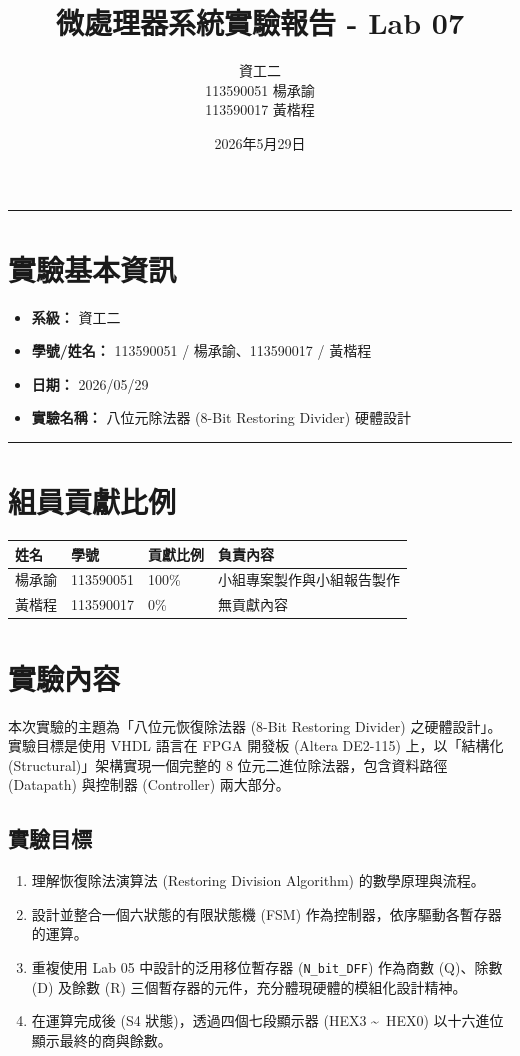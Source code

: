\documentclass[12pt, a4paper]{article}
\title{微處理器系統實驗報告 - Lab 07}
\author{資工二 \\ 113590051 楊承諭 \\ 113590017 黃楷程}
\date{2026年5月29日}
\begin{document}
\maketitle
\hrule

\section*{實驗基本資訊}
\begin{itemize}
    \item \textbf{系級：} 資工二
    \item \textbf{學號/姓名：} 113590051 / 楊承諭、113590017 / 黃楷程
    \item \textbf{日期：} 2026/05/29
    \item \textbf{實驗名稱：} 八位元除法器 (8-Bit Restoring Divider) 硬體設計
\end{itemize}

\hrule

\section*{組員貢獻比例}
\begin{table}[H]
    \centering
    \begin{tabular}{@{}llll@{}}
        \toprule
        \textbf{姓名} & \textbf{學號} & \textbf{貢獻比例} & \textbf{負責內容} \\ \midrule
        楊承諭 & 113590051 & 100\% & 小組專案製作與小組報告製作 \\
        黃楷程 & 113590017 & 0\%   & 無貢獻內容 \\ \bottomrule
    \end{tabular}
\end{table}

\section{實驗內容}

本次實驗的主題為「八位元恢復除法器 (8-Bit Restoring Divider) 之硬體設計」。實驗目標是使用 VHDL 語言在 FPGA 開發板 (Altera DE2-115) 上，以「結構化 (Structural)」架構實現一個完整的 8 位元二進位除法器，包含資料路徑 (Datapath) 與控制器 (Controller) 兩大部分。

\subsection{實驗目標}
\begin{enumerate}
    \item 理解恢復除法演算法 (Restoring Division Algorithm) 的數學原理與流程。
    \item 設計並整合一個六狀態的有限狀態機 (FSM) 作為控制器，依序驅動各暫存器的運算。
    \item 重複使用 Lab 05 中設計的泛用移位暫存器 (\texttt{N\_bit\_DFF}) 作為商數 (Q)、除數 (D) 及餘數 (R) 三個暫存器的元件，充分體現硬體的模組化設計精神。
    \item 在運算完成後 (S4 狀態)，透過四個七段顯示器 (HEX3 \textasciitilde\ HEX0) 以十六進位顯示最終的商與餘數。
\end{enumerate}
\end{document}

